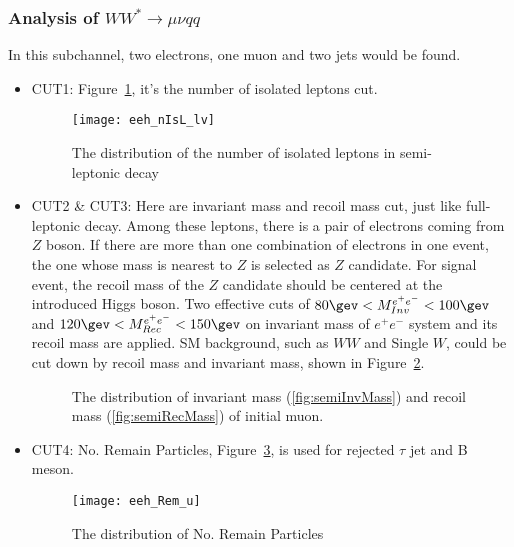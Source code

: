 \documentclass[11pt,a4paper]{cepcnote}
\begin{document}
\subsubsection{Analysis of $WW^*\rightarrow \mu\nu qq$}
In this subchannel, two electrons, one muon and two jets would be found.
\begin{itemize}
\item CUT1: Figure~\ref{fig:seminIsL}, it's the number of isolated leptons cut.
\begin{figure}[H]
\centering
\texttt{[image: eeh\_nIsL\_lv]}
\caption[NO. Isolated Leptons in semi-leptonic decay]{The distribution of the number of isolated leptons 
		in semi-leptonic decay}
\label{fig:seminIsL}
\end{figure}

\item CUT2 \& CUT3: Here are invariant mass and recoil mass cut, just like full-leptonic decay.
Among these leptons, there is a pair of electrons coming from $Z$ boson. 
If there are more than one combination of electrons in one event, 
the one whose mass is nearest to $Z$ is selected as $Z$ candidate. 
For signal event, the recoil mass of the $Z$ candidate should be centered at the introduced Higgs boson. 
Two effective cuts of $80\gev < M^{e^+e^-}_{Inv} < 100\gev$ and $120\gev< M^{e^+e^-}_{Rec} < 150\gev$ 
on invariant mass of $e^+e^-$ system and its recoil mass are applied. 
SM background, such as $WW$ and Single $W$, could be cut down by recoil mass and invariant mass, 
shown in Figure~\ref{fig:semiinvandrec}.\\
\begin{figure}[H]
  \centering
  \caption[]{The distribution of invariant mass (\ref{fig:semiInvMass}) and 
  recoil mass (\ref{fig:semiRecMass}) of initial muon.}
  \label{fig:semiinvandrec}
\end{figure}

\item CUT4: No. Remain Particles, Figure~\ref{fig:seminrem}, is used for rejected $\tau$ jet and B meson.
\begin{figure}[H]
\centering
\texttt{[image: eeh\_Rem\_u]}
\caption[]{The distribution of No. Remain Particles}
\label{fig:seminrem}
\end{figure}


\end{itemize}
\end{document}
